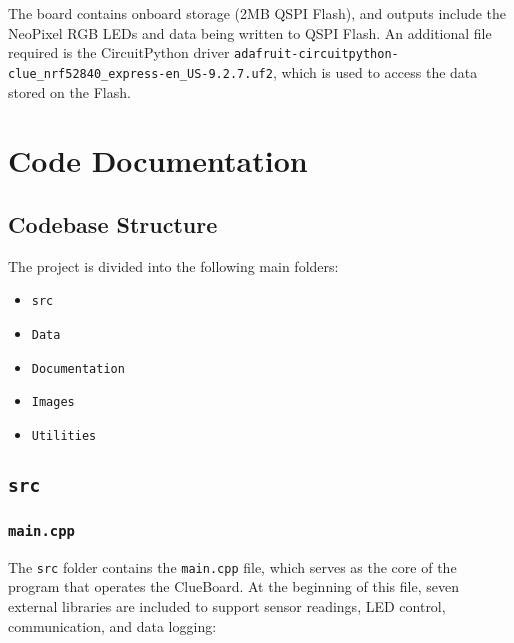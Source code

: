 \documentclass[12pt]{report}
\begin{document}
The board contains onboard storage (2MB QSPI Flash), and outputs include the NeoPixel RGB LEDs and data being written to QSPI Flash. An additional file required is the CircuitPython driver \texttt{adafruit-circuitpython-clue\_nrf52840\_express-en\_US-9.2.7.uf2}, which is used to access the data stored on the Flash.



\chapter{Code Documentation}


\section{Codebase Structure}

The project is divided into the following main folders:

\begin{itemize}
    \item \texttt{src}
    \item \texttt{Data}
    \item \texttt{Documentation}
    \item \texttt{Images}
    \item \texttt{Utilities}
\end{itemize}


\section{\texttt{src}}


\subsection{\texttt{main.cpp}}

The \texttt{src} folder contains the \texttt{main.cpp} file, which serves as the core of the program that operates the ClueBoard. At the beginning of this file, seven external libraries are included to support sensor readings, LED control, communication, and data logging:
\end{document}
